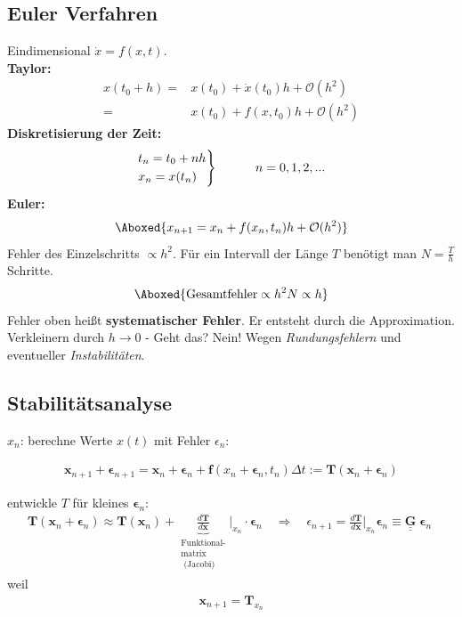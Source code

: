 \documentclass[12pt]{article}
\begin{document}
\subsection{Euler Verfahren}
Eindimensional $\dot{x}= f(x,t)$.\\  %
\textbf{Taylor:}
\begin{align}
x(t_0 +h)=& x(t_0) + \dot{x}(t_0)h+ \mathcal{O} (h^2) \\
=& x(t_0) + f(x,t_0) h+ \mathcal{O} (h^2)
\end{align}
\textbf{Diskretisierung der Zeit:}
\begin{align*}
\begin{rcases}
t_n = t_0 + nh \\ 
x_n = x(t_n)
\end{rcases}
\quad \quad \quad n=0,1,2,...
\end{align*}
\textbf{Euler:}
\begin{align}
\Aboxed{ x_{n+1}= x_n + f(x_n, t_n)h+ \mathcal{O}(h^2)}
\end{align}
Fehler des Einzelschritts $\propto h^2$. Für ein Intervall der Länge $T$ benötigt man $N= \frac{T}{h}$ Schritte.
\begin{align}
\Aboxed{ \mbox{Gesamtfehler} \propto h^2 N \propto h }
\end{align}
Fehler oben heißt \textbf{systematischer Fehler}. Er entsteht durch die Approximation. Verkleinern durch $h \to 0$ - Geht das? Nein! Wegen \textit{Rundungsfehlern} und eventueller \textit{Instabilitäten}.


\subsection{Stabilitätsanalyse}
$x_n$: berechne Werte $x(t)$ mit Fehler $\epsilon_n$:

\begin{align}
\mathbf{x}_{n+1} + \boldsymbol{\epsilon}_{n+1} =\mathbf{x}_n + \boldsymbol{\epsilon}_n + \mathbf{f}( x_n + \boldsymbol{\epsilon}_n, t_n) \Delta t := \mathbf{T}(\mathbf{x}_n + \boldsymbol{\epsilon}_n)
\end{align} 

 entwickle $T$ für kleines $\boldsymbol{\epsilon}_n$: 
 \begin{align}
 \mathbf{T}(\mathbf{x}_n + \boldsymbol{\epsilon}_n) 
 \approx \mathbf{T}(\mathbf{x}_n) + \underbrace{\frac{d\mathbf{T}}{d\mathbf{x}}}_{ \substack{ \text{Funktional-} \\ \text{matrix} \\  \text{ (Jacobi)} }} \biggr\vert_{x_n} \cdot \boldsymbol{\epsilon}_n \quad
 \Rightarrow \quad \epsilon_{n+1} = \frac{d\mathbf{T}}{d\mathbf{x}}  \biggr\vert_{x_n} \boldsymbol{ \epsilon}_n  \equiv \underline{ \underline{\mathbf{G} }} \;  \boldsymbol{\epsilon}_n \; 
 \end{align}
 weil
 \begin{align*}
 \mathbf{x}_{n+1} = \mathbf{T}_{x_n}
 \end{align*}
 
\end{document}
